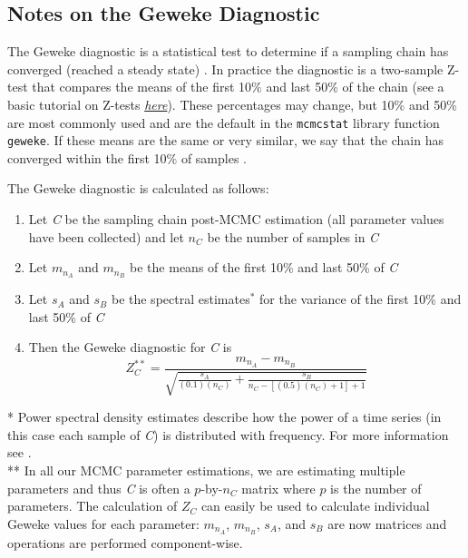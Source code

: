 \begin{appendices}
\subsection{Notes on the Geweke Diagnostic} \label{appendix:gewekediagnostic}
The Geweke diagnostic is a statistical test to determine if a sampling chain has converged (reached a steady state) \cite{geweke1}. In practice the diagnostic is a two-sample Z-test that compares the means of the first 10$\%$ and last 50$\%$ of the chain (see a basic tutorial on Z-tests \textit{\href{https://ncss-wpengine.netdna-ssl.com/wp-content/themes/ncss/pdf/Procedures/PASS/Two-Sample_Z-Tests_Assuming_Equal_Variance.pdf}{here}}). These percentages may change, but 10\% and 50\% are most commonly used and are the default in the \texttt{mcmcstat} library function \texttt{geweke}. If these means are the same or very similar, we say that the chain has converged within the first 10$\%$ of samples \cite{convergediganosticRoy2020}. 
\par The Geweke diagnostic is calculated as follows:
\begin{tcolorbox}
\begin{enumerate}
    \item Let \textit{C} be the sampling chain post-MCMC estimation (all parameter values have been collected) and let $n_C$ be the number of samples in \textit{C}
    \item Let $m_{n_A}$ and $m_{n_B}$ be the means of the first 10\% and last 50\% of \textit{C}
    \item Let $s_A$ and $s_B$ be the spectral estimates$^*$ for the variance of the first 10\% and last 50\% of \textit{C}
    \item Then the Geweke diagnostic for \textit{C} is
    \begin{equation}
        Z_C^{**} = \frac{m_{n_A} - m_{n_B}}{\sqrt{\frac{s_A}{(0.1)(n_C)} + \frac{s_B}{n_C - [(0.5)(n_C)+1]+1}}}
    \end{equation}
\end{enumerate}


* Power spectral density estimates describe how the power of a time series (in this case each sample of \textit{C}) is distributed with frequency. For more information see \cite{Heinzel2002SpectrumAS}. \\
** In all our MCMC parameter estimations, we are estimating multiple parameters and thus \textit{C} is often a $p$-by-$n_C$ matrix where $p$ is the number of parameters. The calculation of $Z_C$ can easily be used to calculate individual Geweke values for each parameter: $m_{n_A}$, $m_{n_B}$, $s_A$, and $s_B$ are now matrices and operations are performed component-wise.


\end{tcolorbox}
\end{appendices}
